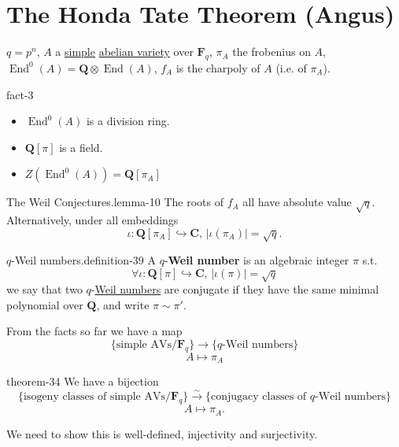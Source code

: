 \documentclass[10pt,]{book}
\newcommand{\terminology}[1]{\textbf{#1}}
\numberwithin{equation}{section}
\newcommand{\lb}{[}
\newcommand{\rb}{]}
\newcommand{\QQ}{\mathbf{Q}}
\newcommand{\CC}{\mathbf{C}}
\newcommand{\FF}{\mathbf{F}}
\DeclareMathOperator{\End}{End}
\begin{document}
\section[{The Honda Tate Theorem (Angus)}]{The Honda Tate Theorem (Angus)}\label{sec-honda-tate}
\hypertarget{p-402}{}%
\(q = p^n\), \(A\) a \hyperref[def-simple-av]{simple} \hyperref[def-buntes-abvar]{abelian variety} over \(\FF_q\), \(\pi_A\) the frobenius on \(A\), \(\End^0(A) = \QQ\otimes \End(A)\), \(f_A\) is the charpoly of \(A\) (i.e. of \(\pi_A\)).%
\begin{fact}{}{}{fact-3}%
\hypertarget{p-403}{}%
\leavevmode%
\begin{itemize}[label=\textbullet]
\item{}\(\End^0(A)\) is a division ring.%
\item{}\(\QQ\lb \pi\rb\) is a field.%
\item{}\(Z(\End^0(A)) = \QQ\lb \pi_A\rb\)%
\end{itemize}
%
\end{fact}
\begin{lemma}{The Weil Conjectures.}{}{lemma-10}%
\hypertarget{p-404}{}%
The roots of \(f_A\) all have absolute value \(\sqrt q\). Alternatively, under all embeddings%
\begin{equation*}
\iota \colon \QQ\lb \pi_A\rb \hookrightarrow \CC,\,|\iota(\pi_A)| = \sqrt q\text{.}
\end{equation*}
%
\end{lemma}
\begin{definition}{\(q\)-Weil numbers.}{definition-39}%
\hypertarget{p-405}{}%
A \(q\)-\terminology{Weil number} is an algebraic integer \(\pi\) s.t.%
\begin{equation*}
\forall \iota \colon \QQ\lb \pi\rb \hookrightarrow \CC,\,|\iota(\pi)| = \sqrt q
\end{equation*}
we say that two \(q\)-\hyperref[sec-honda-tate]{Weil numbers} are conjugate if they have the same minimal polynomial over \(\QQ\), and write \(\pi \sim \pi'\).%
\end{definition}
\hypertarget{p-406}{}%
From the facts so far we have a map%
\begin{equation*}
\{\text{simple AVs}/\FF_q\}\to \{q\text{-Weil numbers}\}
\end{equation*}
%
\begin{equation*}
A \mapsto \pi_A
\end{equation*}
%
\begin{theorem}{}{}{theorem-34}%
\hypertarget{p-407}{}%
We have a bijection%
\begin{equation*}
\{\text{isogeny classes of simple AVs}/\FF_q\}\xrightarrow{\sim} \{\text{conjugacy classes of }q\text{-Weil numbers}\}
\end{equation*}
%
\begin{equation*}
A \mapsto \pi_A\text{.}
\end{equation*}
%
\end{theorem}
\hypertarget{p-408}{}%
We need to show this is well-defined, injectivity and surjectivity.%
%
%
\typeout{************************************************}
\typeout{************************************************}
%
\end{document}
